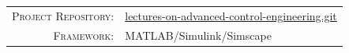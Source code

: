 \documentclass[12pt,a4paper,oneside]{book}
\newcommand{\MetaLabelA}{Project Repository}
\newcommand{\MetaValueA}{https://github.com/pwr-control/lectures-on-advanced-control-engineering.git}
\newcommand{\MetaValueAUrl}{https://github.com/pwr-control/lectures-on-advanced-control-engineering.git}
\newcommand{\MetaValueALabel}{lectures-on-advanced-control-engineering.git}
\newcommand{\MetaLabelB}{Framework}
\newcommand{\MetaValueB}{MATLAB/Simulink/Simscape}
\newcommand{\MetaLabelC}{Architecture}
\newcommand{\MetaValueC}{SiC, EiceDRIVER, Customized Power Supplies}
\begin{document}
	\vfill
	
	\noindent
	\begin{tabular}{@{} r @{\quad} l @{}}
		\textsc{\MetaLabelA:} & {\href{\MetaValueAUrl}{\MetaValueALabel}} \\[3pt]
		\textsc{\MetaLabelB:} & {\MetaValueB}       \\[3pt]
	\end{tabular}
	
	\newpage
	\setcounter{page}{1}
	\tableofcontents
	\listoffigures	
	\listoftables
	\newpage
	
\end{document}
